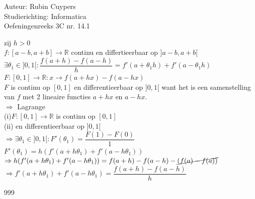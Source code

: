 \documentclass[a4paper]{article}
\begin{document}
  
\noindent \large Auteur: Rubin Cuypers \\
\noindent \large Studierichting: Informatica\\
\noindent \large Oefeningenreeks 3C nr. 14.1\\

\medskip

\normalsize

zij $h>0$\\

$ f:[a-b,a+b] \rightarrow \mathbb{R}$ continu en differtieerbaar op $ ]a-b,a+b[$\\

$\exists \theta_1 \in ]0,1[ : \dfrac{f(a+h)-f(a-h)}{h}=f'(a+\theta_1h)+f'(a-\theta_1h)$\\

$F:[0,1] \rightarrow \mathbb{R} : x \rightarrow f(a+hx)-f(a-hx)$\\

$F$ is continu op $[0,1]$ en differentieerbaar op $ ]0,1[ $ want het is een samenstelling van $f$ met 2 lineaire functies $a+hx$ en $a-hx$.\\

$\Rightarrow$ Lagrange\\

(i)$ F:[0,1] \rightarrow \mathbb{R} $ is continu op $[0,1]$\\

(ii) en differentieerbaar op $]0,1[$\\

$\Rightarrow \exists \theta_1 \in ]0,1[ : F'(\theta_1) =\dfrac{F(1)-F(0)}{1}$\\

$F'(\theta_1)=h(f'(a+h\theta_1)+f'(a-h\theta_1))$\\

$\Rightarrow h(f'(a+h\theta_1)+f'(a-h\theta_1))=f(a+h)-f(a-h)-\cancel{(f(a)-f(a))}$\\

$\Rightarrow f'(a+h\theta_1)+f'(a-h\theta_1)=\dfrac{f(a+h)-f(a-h)}{h}$\\

\begin{thebibliography}{999}
\end{thebibliography}
\end{document}
